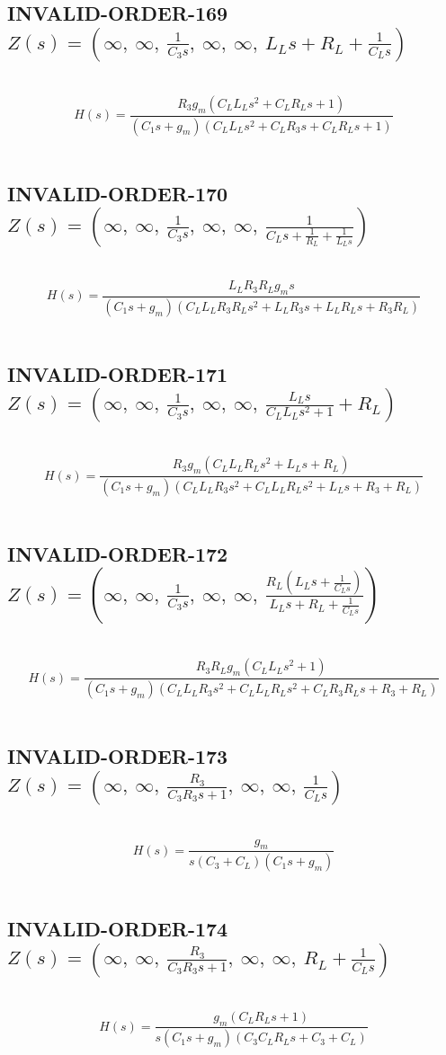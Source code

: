 \documentclass{article}
\begin{document}
\subsection{INVALID-ORDER-169 $Z(s) = \left( \infty, \  \infty, \  \frac{1}{C_{3} s}, \  \infty, \  \infty, \  L_{L} s + R_{L} + \frac{1}{C_{L} s}\right)$ } \ 
\textbf{\[H(s) = \frac{R_{3} g_{m} \left(C_{L} L_{L} s^{2} + C_{L} R_{L} s + 1\right)}{\left(C_{1} s + g_{m}\right) \left(C_{L} L_{L} s^{2} + C_{L} R_{3} s + C_{L} R_{L} s + 1\right)}\] } \ 
\subsection{INVALID-ORDER-170 $Z(s) = \left( \infty, \  \infty, \  \frac{1}{C_{3} s}, \  \infty, \  \infty, \  \frac{1}{C_{L} s + \frac{1}{R_{L}} + \frac{1}{L_{L} s}}\right)$ } \ 
\textbf{\[H(s) = \frac{L_{L} R_{3} R_{L} g_{m} s}{\left(C_{1} s + g_{m}\right) \left(C_{L} L_{L} R_{3} R_{L} s^{2} + L_{L} R_{3} s + L_{L} R_{L} s + R_{3} R_{L}\right)}\] } \ 
\subsection{INVALID-ORDER-171 $Z(s) = \left( \infty, \  \infty, \  \frac{1}{C_{3} s}, \  \infty, \  \infty, \  \frac{L_{L} s}{C_{L} L_{L} s^{2} + 1} + R_{L}\right)$ } \ 
\textbf{\[H(s) = \frac{R_{3} g_{m} \left(C_{L} L_{L} R_{L} s^{2} + L_{L} s + R_{L}\right)}{\left(C_{1} s + g_{m}\right) \left(C_{L} L_{L} R_{3} s^{2} + C_{L} L_{L} R_{L} s^{2} + L_{L} s + R_{3} + R_{L}\right)}\] } \ 
\subsection{INVALID-ORDER-172 $Z(s) = \left( \infty, \  \infty, \  \frac{1}{C_{3} s}, \  \infty, \  \infty, \  \frac{R_{L} \left(L_{L} s + \frac{1}{C_{L} s}\right)}{L_{L} s + R_{L} + \frac{1}{C_{L} s}}\right)$ } \ 
\textbf{\[H(s) = \frac{R_{3} R_{L} g_{m} \left(C_{L} L_{L} s^{2} + 1\right)}{\left(C_{1} s + g_{m}\right) \left(C_{L} L_{L} R_{3} s^{2} + C_{L} L_{L} R_{L} s^{2} + C_{L} R_{3} R_{L} s + R_{3} + R_{L}\right)}\] } \ 
\subsection{INVALID-ORDER-173 $Z(s) = \left( \infty, \  \infty, \  \frac{R_{3}}{C_{3} R_{3} s + 1}, \  \infty, \  \infty, \  \frac{1}{C_{L} s}\right)$ } \ 
\textbf{\[H(s) = \frac{g_{m}}{s \left(C_{3} + C_{L}\right) \left(C_{1} s + g_{m}\right)}\] } \ 
\subsection{INVALID-ORDER-174 $Z(s) = \left( \infty, \  \infty, \  \frac{R_{3}}{C_{3} R_{3} s + 1}, \  \infty, \  \infty, \  R_{L} + \frac{1}{C_{L} s}\right)$ } \ 
\textbf{\[H(s) = \frac{g_{m} \left(C_{L} R_{L} s + 1\right)}{s \left(C_{1} s + g_{m}\right) \left(C_{3} C_{L} R_{L} s + C_{3} + C_{L}\right)}\] } \ 
\end{document}
